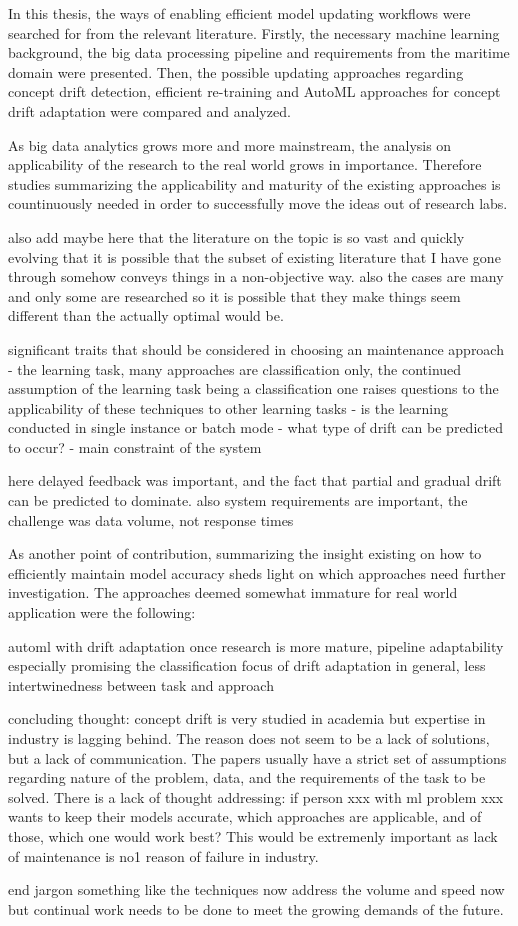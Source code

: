 In this thesis, the ways of enabling efficient model updating workflows were searched for from the relevant literature. Firstly, the necessary machine learning background, the big data processing pipeline and requirements from the maritime domain were presented. Then, the possible updating approaches regarding concept drift detection, efficient re-training and AutoML approaches for concept drift adaptation were compared and analyzed.

As big data analytics grows more and more mainstream, the analysis on applicability of the research to the real world grows in importance. Therefore studies summarizing the applicability and maturity of the existing approaches is countinuously needed in order to successfully move the ideas out of research labs.

also add maybe here that the literature on the topic is so vast and quickly evolving that it is possible that the subset of existing literature that I have gone through somehow conveys things in a non-objective way. also the cases are many and only some are researched so it is possible that they make things seem different than the actually optimal would be.

significant traits that should be considered in choosing an maintenance approach
 - the learning task, many approaches are classification only, the continued assumption of the learning task being a classification one raises questions to the applicability of these techniques to other learning tasks
 - is the learning conducted in single instance or batch mode
 - what type of drift can be predicted to occur?
 - main constraint of the system
 
 here delayed feedback was important, and the fact that partial and gradual drift can be predicted to dominate. also system requirements are important, the challenge was data volume, not response times
 
 As another point of contribution, summarizing the insight existing on how to efficiently maintain model accuracy sheds light on which approaches need further investigation. The approaches deemed somewhat immature for real world application were the following:
 
 automl with drift adaptation once research is more mature, pipeline adaptability especially promising
 the classification focus of drift adaptation in general, less intertwinedness between task and approach
 
 concluding thought: concept drift is very studied in academia but expertise in industry is lagging behind. The reason does not seem to be a lack of solutions, but a lack of communication. The papers usually have a strict set of assumptions regarding nature of the problem, data, and the requirements of the task to be solved. There is a lack of thought addressing: if person xxx with ml problem xxx wants to keep their models accurate, which approaches are applicable, and of those, which one would work best? This would be extremenly important as lack of maintenance is no1 reason of failure in industry.
 
 end jargon something like the techniques now address the volume and speed now but continual work needs to be done to meet the growing demands of the future.
